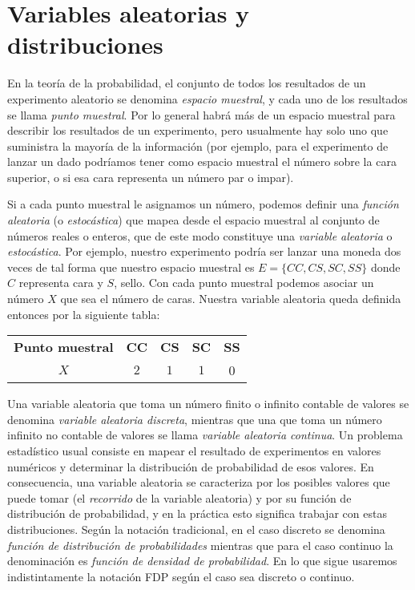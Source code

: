 



\section{Variables aleatorias y distribuciones}


En la teoría de la probabilidad, el conjunto de todos los resultados de un experimento aleatorio se denomina \textit{espacio muestral}, y cada uno de los resultados se llama \textit{punto muestral}. Por lo general habrá más de un espacio muestral para describir los resultados de un experimento, pero usualmente hay solo uno que suministra la mayoría de la información (por ejemplo, para el experimento de lanzar un dado podríamos tener como espacio muestral el número sobre la cara superior, o si esa cara representa un número par o impar).

Si a cada punto muestral le asignamos un número, podemos definir una \textit{función aleatoria} (o \textit{estocástica}) que mapea desde el espacio muestral al conjunto de números reales o enteros, que de este modo constituye una \textit{variable aleatoria} o \textit{estocástica}. Por ejemplo, nuestro experimento podría ser lanzar una moneda dos veces de tal forma que nuestro espacio muestral es $E = \{CC, CS, SC, SS\}$ donde $C$ representa cara y $S$, sello. Con cada punto muestral podemos asociar un número $X$ que sea el número de caras. Nuestra variable aleatoria queda definida entonces por la siguiente tabla:

\begin{center}
 \begin{tabular} {ccccc} 
 \toprule
  \textbf{Punto muestral} & \textbf{CC} & \textbf{CS} & \textbf{SC} & \textbf{SS} \\
  $X$ & $2$ & $1$ & $1$ & 0 \\
  \bottomrule
 \end{tabular}
\end{center}

Una variable aleatoria que toma un número finito o infinito contable de valores se denomina \textit{variable aleatoria discreta}, mientras que una que toma un número infinito no contable de valores se llama \textit{variable aleatoria continua}. Un problema estadístico usual consiste en mapear el resultado de experimentos en valores numéricos y determinar la distribución de probabilidad de esos valores. En consecuencia, una variable aleatoria se caracteriza por los posibles valores que puede tomar (el \textit{recorrido} de la variable aleatoria) y por su función de distribución de probabilidad, y en la práctica esto significa trabajar con estas distribuciones. Según la notación tradicional, en el caso  discreto se denomina \textit{función de distribución de probabilidades} mientras que para el caso continuo la denominación es \textit{función de densidad de probabilidad}. En lo que sigue usaremos indistintamente la notación FDP según el caso sea discreto o continuo.

